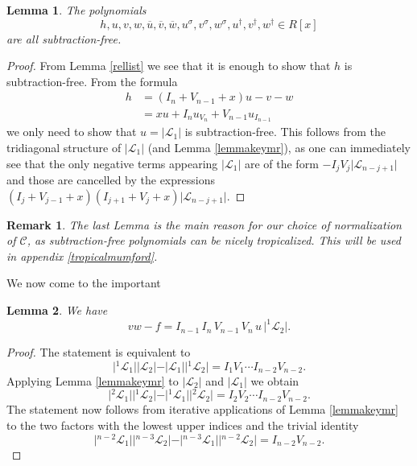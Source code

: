 \documentclass[11pt, a4paper]{amsart}
\newcommand{\eqst}[1]{\begin{equation*}#1\end{equation*}}
\theoremstyle{plain}
\newtheorem{lemma}{Lemma}[section]
\newtheorem{remark}{Remark}[section]
\numberwithin{equation}{section}
\begin{document}
\begin{lemma}
\label{subfree}
The polynomials \eqst{h,u,v,w,\overline u, \overline v, \overline w,u^\sigma,v^\sigma,w^\sigma,u^\dagger,v^\dagger,w^\dagger \in R[x]} are all subtraction-free.
\end{lemma}
\begin{proof}
From Lemma \ref{rellist} we see that it is enough to show that $h$ is subtraction-free. From the formula \begin{align*}h &= (I_n+V_{n-1}+x) u - v - w \\ &=x u + I_n u_{V_n}+V_{n-1}u_{I_{n-1}} \end{align*} we only need to show that $u = \vert \mathcal L _1 \vert$ is subtraction-free. This follows from the tridiagonal structure of $\vert \mathcal L _1 \vert$ (and Lemma \ref{lemmakeymr}), as one can immediately see that the only negative terms appearing $\vert \mathcal L _ 1 \vert$ are of the form $-I_j V_j \vert \mathcal L _{n-j+1} \vert $ and those are cancelled by the expressions $(I_j +V_{j-1}+ x) (I_{j+1}+V_j+x) \vert \mathcal L _{n-j+1} \vert$.
\end{proof}
\begin{remark}
The last Lemma is the main reason for our choice of normalization of $\mathcal C$, as subtraction-free polynomials can be nicely tropicalized. This will be used in appendix \ref{tropicalmumford}.
\end{remark}
\noindent We now come to the important 
\begin{lemma}
\label{basicrel}
We have \eqst{vw - f = I_{n-1} \,I_n \,V_{n-1} \,V_n \, u \, \vert^{1}\mathcal L _2 \vert.}
\end{lemma}
\begin{proof}
The statement is equivalent to \eqst{\vert {}^1\mathcal L_1\vert \vert \mathcal L _2 \vert - \vert \mathcal L _1\vert \vert{}^1\mathcal L _2\vert = I_1V_1 \cdots I_{n-2}V_{n-2}.} Applying Lemma \ref{lemmakeymr} to $\vert \mathcal L _2 \vert$ and $\vert \mathcal L _1\vert$ we obtain \eqst{\vert{}^2 \mathcal L _1\vert \vert{}^1 \mathcal L _2\vert - \vert{}^1 \mathcal L _1\vert \vert{}^2 \mathcal L _2\vert = I_2 V_2 \cdots I_{n-2}V_{n-2}.} The statement now follows from iterative applications of Lemma \ref{lemmakeymr} to the two factors with the lowest upper indices and the trivial identity \eqst{\vert{}^{n-2}\mathcal L_1\vert\vert{}^{n-3}\mathcal L_2\vert-\vert{}^{n-3}\mathcal L_1\vert\vert{}^{n-2}\mathcal L_2\vert = I_{n-2}V_{n-2}.}
\end{proof}
\end{document}
